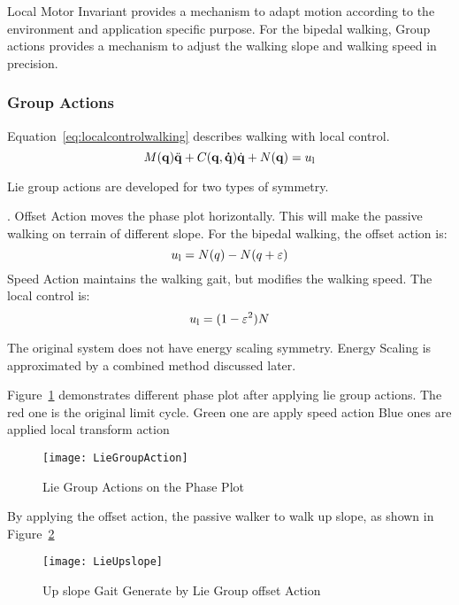 Local Motor Invariant provides a mechanism to adapt motion according to the environment and application specific purpose. 
For the bipedal walking, Group actions provides a mechanism to adjust the walking slope and walking speed in precision.




\subsubsection{Group Actions}

Equation~\ref{eq:localcontrolwalking} describes walking with local control.
\begin{equation}
\label{eq:localcontrolwalking}
M(\mathbf{q}) \ddot{\mathbf{q}} + C(\mathbf{q,\dot{q}})\dot{\mathbf{q}} + N(\mathbf{q}) = u_{\mathrm{l}}
\end{equation}




Lie group actions are developed for two types of symmetry.
\begin{itemize}

.
Offset Action moves the phase plot horizontally.
This will make the passive walking on terrain of different slope.
For the bipedal walking, the offset action is:
\[
u_{\mathrm{l}}=N(q)-N(q+\varepsilon)
\]
Speed Action maintains the walking gait, but modifies the walking speed.
The local control is:
\[  
u_{\mathrm{l}}=(1-\varepsilon^2)N
\]
\end{itemize}

The original system does not have energy scaling symmetry.
Energy Scaling is approximated by a combined method discussed later.

Figure~\ref{fig:walkliegroupphase} demonstrates different phase plot after applying lie group actions.
The red one is the original limit cycle.
Green one are apply speed action
Blue ones are applied local transform action


\begin{figure}[!htbp]
  \begin{center}
     \texttt{[image: LieGroupAction]}
    \caption{Lie Group Actions on the Phase Plot}
    \label{fig:walkliegroupphase}
\end{center}
\end{figure}


By applying the offset action,   the passive walker to walk up slope, as shown in Figure~\ref{fig:liegroupupslope}
\begin{figure}[!htbp]
  \begin{center}
      \texttt{[image: LieUpslope]}
    \caption{Up slope Gait Generate by Lie Group offset Action}
    \label{fig:liegroupupslope}
\end{center}
\end{figure}

